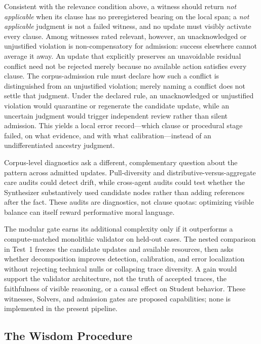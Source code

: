Consistent with the relevance condition above, a witness should return
\emph{not applicable} when its clause has no preregistered bearing on the local
span; a \emph{not applicable} judgment is not a failed witness, and no update
must visibly activate every clause. Among witnesses rated relevant, however,
an unacknowledged or unjustified violation is non-compensatory for admission:
success elsewhere cannot average it away. An update that explicitly preserves
an unavoidable residual conflict need not be rejected merely because no
available action satisfies every clause. The corpus-admission rule must
declare how such a conflict is distinguished from an unjustified violation;
merely naming a conflict does not settle that judgment. Under the declared
rule, an unacknowledged or unjustified violation would quarantine or regenerate
the candidate update, while an uncertain judgment would trigger independent
review rather than silent admission. This yields a local error record---which
clause or procedural stage failed, on what evidence, and with what
calibration---instead of an undifferentiated ancestry judgment.

Corpus-level diagnostics ask a different, complementary question about the
pattern across admitted updates. Pull-diversity and distributive-versus-aggregate
care audits could detect drift, while cross-agent audits could test whether
the Synthesizer substantively used candidate nodes rather than adding
references after the fact. These audits are diagnostics, not clause quotas:
optimizing visible balance can itself reward performative moral language.

The modular gate earns its additional complexity only if it outperforms a
compute-matched monolithic validator on held-out cases. The nested comparison
in Test~1 freezes the candidate updates and available resources, then asks
whether decomposition improves detection, calibration, and error localization
without rejecting technical nulls or collapsing trace diversity. A gain would
support the validator architecture, not the truth of accepted traces, the
faithfulness of visible reasoning, or a causal effect on Student behavior.
These witnesses, Solvers, and admission gates are proposed capabilities; none
is implemented in the present pipeline.

\subsection{The Wisdom Procedure}\label{sec:wisdom-procedure}

